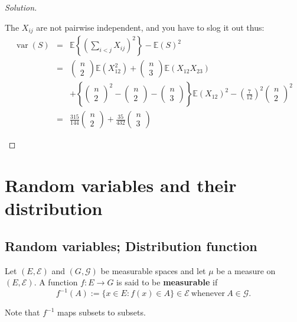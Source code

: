 \documentclass[11pt,singlecolumn, openany, citestyle=authoryear]{elegantbook}
\begin{document}
\begin{CJK}{UTF8}{gbsn}
\begin{proof}[Solution]
\begin{enumerate}
        The $X_{i j}$ are not pairwise independent, and you have to slog it out thus:
        \begin{eqnarray*}
        \operatorname{var}(S) & = &\mathbb{E}\left\{\left(\sum_{i<j} X_{i j}\right)^2\right\}
        -\mathbb{E}(S)^2 \\
        &=&\left(\begin{array}{c}
        n \\
        2
        \end{array}\right) \mathbb{E}\left(X_{12}^2\right)+\left(\begin{array}{c}
        n \\
        3
        \end{array}\right) \mathbb{E}\left(X_{12} X_{23}\right)\\
        &\;& +\left\{\left(\begin{array}{c}
        n \\
        2
        \end{array}\right)^2-\left(\begin{array}{c}
        n \\
        2
        \end{array}\right)-\left(\begin{array}{c}
        n \\
        3
        \end{array}\right)\right\} \mathbb{E}\left(X_{12}\right)^2
        -\left(\frac{7}{12}\right)^2\left(\begin{array}{c}
        n \\
        2
        \end{array}\right)^2 \\
        &=&\frac{315}{144}\left(\begin{array}{c}
        n \\
        2
        \end{array}\right)+\frac{35}{432}\left(\begin{array}{c}
        n \\
        3
        \end{array}\right)
        \end{eqnarray*}
    \end{enumerate}
\end{proof}


\chapter{Random variables and their distribution}
\section{Random variables; Distribution function}
\begin{definition}
    Let $(E, \mathcal{E})$ and $(G, \mathcal{G} )$ 
    be measurable spaces and let $\mu$ be a measure on $(E, \mathcal{E})$.
A function $f : E \to G$ is said to be \textbf{measurable} if
$$
f^{-1}(A) := \{x \in E: f(x) \in A \} \in \mathcal{E} \ \text{whenever} \ A \in \mathcal{G}.
$$
\end{definition}
Note that $f^{-1}$ maps subsets to subsets.


\end{CJK}
\end{document}
